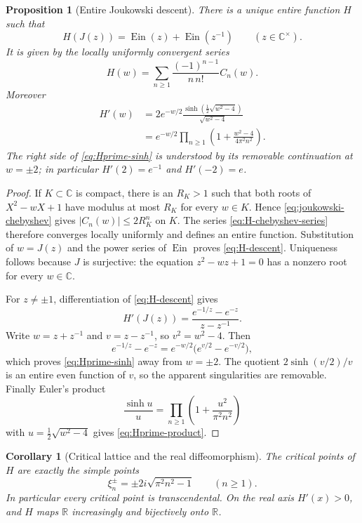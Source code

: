 \documentclass[11pt]{article}
\newtheorem{proposition}[theorem]{Proposition}
\newtheorem{corollary}[theorem]{Corollary}
\theoremstyle{definition}
\theoremstyle{remark}
\newcommand{\C}{\mathbb C}
\newcommand{\Ein}{\operatorname{Ein}}
\begin{document}
\begin{proposition}[Entire Joukowski descent]\label{prop:entire-joukowski-descent}
There is a unique entire function $H$ such that
\begin{equation}\label{eq:H-descent}
 H(J(z))=\Ein(z)+\Ein(z^{-1})\qquad(z\in\C^\times).
\end{equation}
It is given by the locally uniformly convergent series
\begin{equation}\label{eq:H-chebyshev-series}
 H(w)=\sum_{n\geq1}\frac{(-1)^{n-1}}{n\,n!}C_n(w).
\end{equation}
Moreover
\begin{align}
 H'(w)
 &=2e^{-w/2}
   \frac{\sinh\!\left(\frac12\sqrt{w^2-4}\right)}{\sqrt{w^2-4}}
   \label{eq:Hprime-sinh}\\
 &=e^{-w/2}\prod_{n\geq1}
   \left(1+\frac{w^2-4}{4\pi^2n^2}\right).
   \label{eq:Hprime-product}
\end{align}
The right side of \eqref{eq:Hprime-sinh} is understood by its removable
continuation at $w=\pm2$; in particular $H'(2)=e^{-1}$ and
$H'(-2)=e$.
\end{proposition}

\begin{proof}
If $K\subset\C$ is compact, there is an $R_K>1$ such that both roots of
$X^2-wX+1$ have modulus at most $R_K$ for every $w\in K$.  Hence
\eqref{eq:joukowski-chebyshev} gives
$|C_n(w)|\leq2R_K^n$ on $K$.  The series
\eqref{eq:H-chebyshev-series} therefore converges locally uniformly and
defines an entire function.  Substitution of $w=J(z)$ and the power series
of $\Ein$ proves \eqref{eq:H-descent}.  Uniqueness follows because $J$ is
surjective: the equation $z^2-wz+1=0$ has a nonzero root for every
$w\in\C$.

For $z\ne\pm1$, differentiation of \eqref{eq:H-descent} gives
\[
 H'(J(z))
 =\frac{e^{-1/z}-e^{-z}}{z-z^{-1}}.
\]
Write $w=z+z^{-1}$ and $v=z-z^{-1}$, so $v^2=w^2-4$.  Then
\[
 e^{-1/z}-e^{-z}
 =e^{-w/2}\bigl(e^{v/2}-e^{-v/2}\bigr),
\]
which proves \eqref{eq:Hprime-sinh} away from $w=\pm2$.  The quotient
$2\sinh(v/2)/v$ is an entire even function of $v$, so the apparent
singularities are removable.  Finally Euler's product
\[
 \frac{\sinh u}{u}=\prod_{n\geq1}
   \left(1+\frac{u^2}{\pi^2n^2}\right)
\]
with $u=\frac12\sqrt{w^2-4}$ gives
\eqref{eq:Hprime-product}.
\end{proof}

\begin{corollary}[Critical lattice and the real diffeomorphism]
\label{cor:H-critical-lattice}
The critical points of $H$ are exactly the simple points
\begin{equation}\label{eq:H-critical-points}
 \xi_n^\pm=\pm2i\sqrt{\pi^2n^2-1}\qquad(n\geq1).
\end{equation}
In particular every critical point is transcendental.  On the real axis
$H'(x)>0$, and $H$ maps $\mathbb R$ increasingly and bijectively onto
$\mathbb R$.
\end{corollary}
\end{document}
